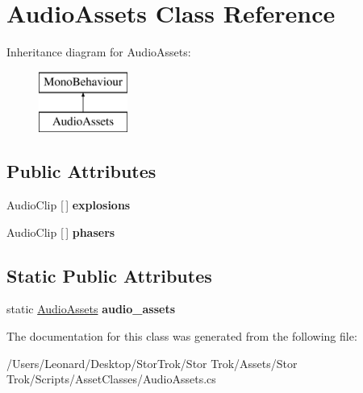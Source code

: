 \hypertarget{class_audio_assets}{}\section{Audio\+Assets Class Reference}
\label{class_audio_assets}
Inheritance diagram for Audio\+Assets\+:\begin{figure}[H]
\begin{center}
\leavevmode
\includegraphics[height=2.000000cm]{class_audio_assets}
\end{center}
\end{figure}
\subsection*{Public Attributes}
\begin{DoxyCompactItemize}
\item 
\mbox{\label{class_audio_assets_a6c0372672280f3c1a7e289c699d01bd6}} 
Audio\+Clip \mbox{[}$\,$\mbox{]} {\bfseries explosions}
\item 
\mbox{\label{class_audio_assets_a2c6105d12139e154693c8776fdec5f00}} 
Audio\+Clip \mbox{[}$\,$\mbox{]} {\bfseries phasers}
\end{DoxyCompactItemize}
\subsection*{Static Public Attributes}
\begin{DoxyCompactItemize}
\item 
\mbox{\label{class_audio_assets_a32df5d1b5c2799c970b00f4bac8cd9dc}} 
static \hyperlink{class_audio_assets}{Audio\+Assets} {\bfseries audio\+\_\+assets}
\end{DoxyCompactItemize}


The documentation for this class was generated from the following file\+:\begin{DoxyCompactItemize}
\item 
/\+Users/\+Leonard/\+Desktop/\+Stor\+Trok/\+Stor Trok/\+Assets/\+Stor Trok/\+Scripts/\+Asset\+Classes/Audio\+Assets.\+cs\end{DoxyCompactItemize}
